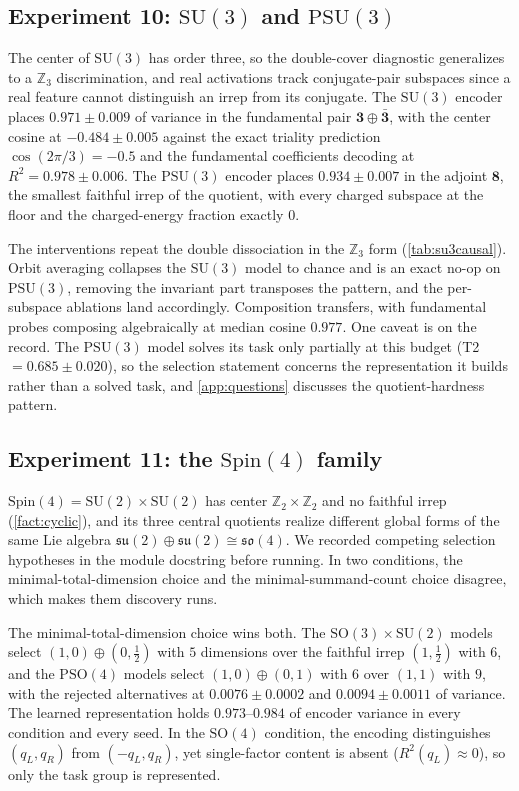 \documentclass{article}
\newcommand{\SU}{\mathrm{SU}}
\newcommand{\SO}{\mathrm{SO}}
\newcommand{\PSU}{\mathrm{PSU}}
\newcommand{\Spin}{\mathrm{Spin}}
\newcommand{\PSO}{\mathrm{PSO}}
\newcommand{\Z}{\mathbb{Z}}
\begin{document}
\subsection{Experiment 10: \texorpdfstring{$\SU(3)$ and
$\PSU(3)$}{SU(3) and PSU(3)}}

The center of $\SU(3)$ has order three, so the double-cover
diagnostic generalizes to a $\Z_3$ discrimination, and real
activations track conjugate-pair subspaces since a real feature
cannot distinguish an irrep from its conjugate. The $\SU(3)$ encoder
places $0.971 \pm 0.009$ of variance in the fundamental pair
$\mathbf{3} \oplus \bar{\mathbf{3}}$, with the center cosine at
$-0.484 \pm 0.005$ against the exact triality prediction
$\cos(2\pi/3) = -0.5$ and the fundamental coefficients decoding at
$R^2 = 0.978 \pm 0.006$. The $\PSU(3)$ encoder places
$0.934 \pm 0.007$ in the adjoint $\mathbf{8}$, the smallest faithful
irrep of the quotient, with every charged subspace at the floor and
the charged-energy fraction exactly $0$.

The interventions repeat the double dissociation in the $\Z_3$ form
(\cref{tab:su3causal}). Orbit averaging collapses the $\SU(3)$ model
to chance and is an exact no-op on $\PSU(3)$, removing the invariant
part transposes the pattern, and the per-subspace ablations land
accordingly. Composition transfers, with fundamental probes composing
algebraically at median cosine $0.977$. One caveat is on the record.
The $\PSU(3)$ model solves its task only partially at this budget
(T2 $= 0.685 \pm 0.020$), so the selection statement concerns the
representation it builds rather than a solved task, and
\cref{app:questions} discusses the quotient-hardness pattern.

\subsection{Experiment 11: the \texorpdfstring{$\Spin(4)$}{Spin(4)}
family}

$\Spin(4) = \SU(2) \times \SU(2)$ has center $\Z_2 \times \Z_2$ and no
faithful irrep (\cref{fact:cyclic}), and its three central quotients
realize different global forms of the same Lie algebra $\mathfrak{su}(2)
\oplus \mathfrak{su}(2) \cong \mathfrak{so}(4)$. We
recorded competing selection hypotheses in the module docstring
before running. In two conditions, the minimal-total-dimension
choice and the minimal-summand-count choice disagree, which makes
them discovery runs.

The minimal-total-dimension choice wins both. The
$\SO(3){\times}\SU(2)$ models select $(1,0) \oplus (0,\tfrac12)$ with
$5$ dimensions over the faithful irrep $(1,\tfrac12)$ with $6$, and
the $\PSO(4)$ models select $(1,0) \oplus (0,1)$ with $6$ over
$(1,1)$ with $9$, with the rejected alternatives at
$0.0076 \pm 0.0002$ and $0.0094 \pm 0.0011$ of variance. The learned
representation holds $0.973$--$0.984$ of encoder variance in every
condition and every seed. In the $\SO(4)$ condition, the encoding
distinguishes $(q_L, q_R)$ from $(-q_L, q_R)$, yet single-factor
content is absent ($R^2(q_L) \approx 0$), so only the task group is
represented.
\end{document}
